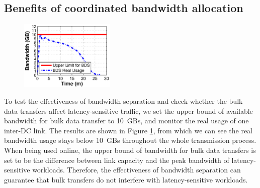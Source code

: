 
\subsection{Benefits of coordinated bandwidth allocation}
\label{subsec:evaluation:separation}
\begin{figure}[t]
  \centering
  \includegraphics[width=45mm]{images/Quota_v2.eps}%
  \label{fig:quota}
\vspace{-0.4cm}
\end{figure}

To test the effectiveness of bandwidth separation and check whether the bulk data transfers affect latency-sensitive traffic, we set the upper bound of available bandwidth for bulk data transfer to 10~GBs, and monitor the real usage of one inter-DC link. The results are shown in Figure \ref{fig:quota}, from which we can see the real bandwidth usage stays below 10~GBs throughout the whole transmission process.
When being used online, the upper bound of bandwidth for bulk data transfers is set to be the difference between link capacity and the peak bandwidth of latency-sensitive workloads. Therefore, the effectiveness of \name bandwidth separation can guarantee that bulk transfers do not interfere with latency-sensitive workloads.%

